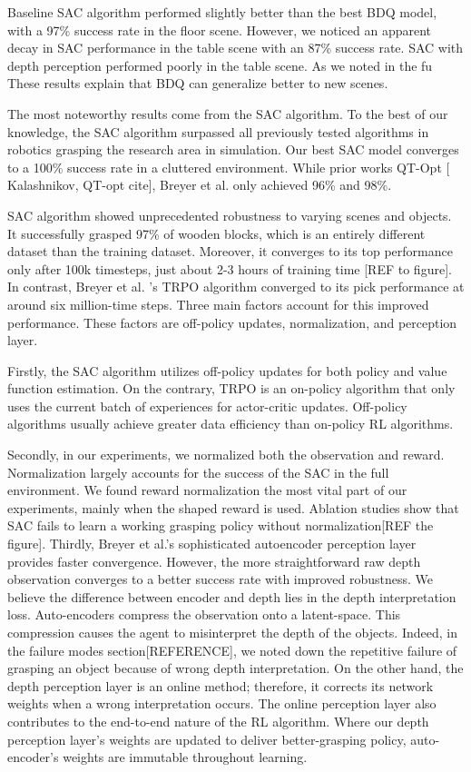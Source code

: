 Baseline SAC algorithm performed slightly better than the best BDQ model, with a 97\% success rate in the floor scene. However, we noticed an apparent decay in SAC performance in the table scene with an 87\% success rate. SAC with depth perception performed poorly in the table scene. As we noted in the fu 
These results explain that BDQ can generalize better to new scenes.

The most noteworthy results come from the SAC algorithm. To the best of our knowledge, the SAC algorithm surpassed all previously tested algorithms in robotics grasping the research area in simulation. Our best SAC model converges to a 100\% success rate in a cluttered environment. While prior works QT-Opt [ Kalashnikov, QT-opt cite], Breyer et al. only achieved 96\% and 98\%. 

SAC algorithm showed unprecedented robustness to varying scenes and objects. It successfully grasped 97\% of wooden blocks, which is an entirely different dataset than the training dataset. Moreover, it converges to its top performance only after 100k timesteps, just about 2-3 hours of training time [REF to figure]. In contrast, Breyer et al. 's TRPO algorithm converged to its pick performance at around six million-time steps. Three main factors account for this improved performance. These factors are off-policy updates, normalization, and perception layer. 

Firstly, the SAC algorithm utilizes off-policy updates for both policy and value function estimation. On the contrary, TRPO is an on-policy algorithm that only uses the current batch of experiences for actor-critic updates. Off-policy algorithms usually achieve greater data efficiency than on-policy RL algorithms.

Secondly, in our experiments, we normalized both the observation and reward. Normalization largely accounts for the success of the SAC in the full environment. We found reward normalization the most vital part of our experiments, mainly when the shaped reward is used. Ablation studies show that SAC fails to learn a working grasping policy without normalization[REF the figure].
Thirdly, Breyer et al.'s sophisticated autoencoder perception layer provides faster convergence. However, the more straightforward raw depth observation converges to a better success rate with improved robustness. We believe the difference between encoder and depth lies in the depth interpretation loss. Auto-encoders compress the observation onto a latent-space. This compression causes the agent to misinterpret the depth of the objects. Indeed, in the failure modes section[REFERENCE], we noted down the repetitive failure of grasping an object because of wrong depth interpretation.
On the other hand, the depth perception layer is an online method; therefore, it corrects its network weights when a wrong interpretation occurs. The online perception layer also contributes to the end-to-end nature of the RL algorithm. Where our depth perception layer's weights are updated to deliver better-grasping policy, auto-encoder's weights are immutable throughout learning.

